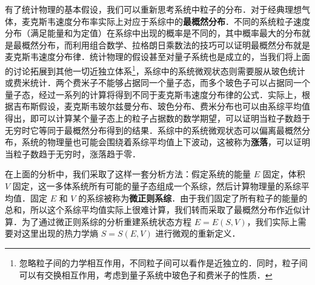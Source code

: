 有了统计物理的基本假设，我们可以重新思考系统中粒子的分布．对于经典理想气体，麦克斯韦速度分布率实际上对应于系综中的\textbf{最概然分布}．不同的系统粒子速度分布（满足能量和为定值）在系综中出现的概率是不同的，其中概率最大的分布就是最概然分布，而利用组合数学、拉格朗日乘数法的技巧可以证明最概然分布就是麦克斯韦速度分布律．统计物理的假设甚至对量子系统也是成立的，当我们将上面的讨论拓展到其他一切近独立体系\footnote{忽略粒子间的力学相互作用，不同粒子间可以看作是近独立的．同时，粒子间可以有交换相互作用，考虑到量子系统中玻色子和费米子的性质．}，系综中的系统微观状态则需要服从玻色统计或费米统计．两个费米子不能够占据同一个量子态，而多个玻色子可以占据同一个量子态，经过一系列的计算将得到不同于麦克斯韦速度分布律的公式．实际上，根据吉布斯假设，麦克斯韦玻尔兹曼分布、玻色分布、费米分布也可以由系综平均值得出，即可以计算某个量子态上的粒子占据数的数学期望，可以证明当粒子数趋于无穷时它等同于最概然分布得到的结果．系综中的系统微观状态可以偏离最概然分布，系统的物理量也可能会围绕着系综平均值上下波动，这被称为\textbf{涨落}，可以证明当粒子数趋于无穷时，涨落趋于零．

在上面的分析中，我们采取了这样一套分析方法：假定系统的能量 $E$ 固定，体积 $V$ 固定，这一多体系统所有可能的量子态组成一个系综，然后计算物理量的系综平均值．固定 $E$ 和 $V$ 的系综被称为\textbf{微正则系综}．由于我们固定了所有粒子的能量的总和，所以这个系综平均值实际上很难计算，我们转而采取了最概然分布作近似计算．为了通过微正则系综的分析重建系统状态方程 $E=E(S,V)$，我们实际上需要对这里出现的热力学熵 $S=S(E,V)$ 进行微观的重新定义．